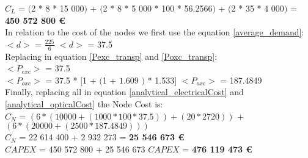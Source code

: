 $C_L$ = $($2 * 8 * 15 000$)$ + $($2 * 8 * 5 000 * 100 * 56.2566$)$ + $($2 * 35 * 4 000$)$ = \textbf{450 572 800 \euro}\\

In relation to the cost of the nodes we first use the equation \ref{average_demand}:\\

$<d>$ = $\frac{225}{6}$ \qquad \qquad $<d>$ = 37.5\\

Replacing in equation \ref{Pexc_transp} and \ref{Poxc_transp}:\\

$<P_{exc}>$ = 37.5\\

$<P_{oxc}>$ = 37.5 * $[$1 + $($1 + $1.609$ $)$ * 1.533$]$ \qquad \quad $<P_{oxc}>$ = 187.4849 \\

Finally, replacing all in equation \ref{analytical_electricalCost} and \ref{analytical_opticalCost} the Node Cost is:\\

$C_N$ = $\left(6 * (10 000 + (1 000 * 100 * 37.5)) + (20 * 2 720)\right)$ + $\left(6 * (20 000 + (2 500 * 187.4849)) \right)$\\

$C_N$ = 22 614 400 + 2 932 273 = \textbf{25 546 673 \euro}\\

$CAPEX$ = 450 572 800 + 25 546 673 \qquad \qquad $CAPEX$ = \textbf{476 119 473 \euro}

